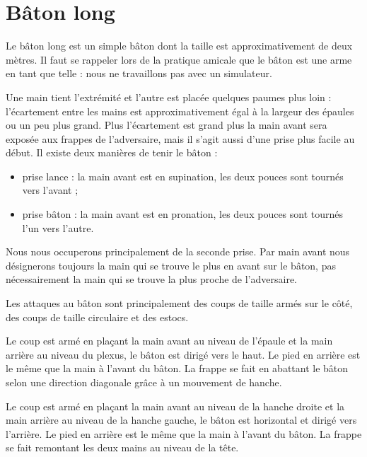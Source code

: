 \chapter{Bâton long}


Le bâton long est un simple bâton dont la taille est approximativement de deux mètres.
Il faut se rappeler lors de la pratique amicale que le bâton est une arme en tant que telle : nous ne travaillons pas avec un simulateur.

Une main tient l'extrémité et l'autre est placée quelques paumes plus loin : l'écartement entre les mains est approximativement égal à la largeur des épaules ou un peu plus grand.
Plus l'écartement est grand plus la main avant sera exposée aux frappes de l'adversaire, mais il s'agit aussi d'une prise plus facile au début.
Il existe deux manières de tenir le bâton :
\begin{itemize}
	\item prise lance : la main avant est en supination, les deux pouces sont tournés vers l'avant ;
	\item prise bâton : la main avant est en pronation, les deux pouces sont tournés l'un vers l'autre.
\end{itemize}
Nous nous occuperons principalement de la seconde prise.
Par main avant nous désignerons toujours la main qui se trouve le plus en avant sur le bâton, pas nécessairement la main qui se trouve la plus proche de l'adversaire.

Les attaques au bâton sont principalement des coups de taille armés sur le côté, des coups de taille circulaire et des estocs.


\begin{coup}

Le coup est armé en plaçant la main avant au niveau de l'épaule et la main arrière au niveau du plexus, le bâton est dirigé vers le haut.
Le pied en arrière est le même que la main à l'avant du bâton.
La frappe se fait en abattant le bâton selon une direction diagonale grâce à un mouvement de hanche.
\end{coup}


\begin{coup}

Le coup est armé en plaçant la main avant au niveau de la hanche droite et la main arrière au niveau de la hanche gauche, le bâton est horizontal et dirigé vers l'arrière.
Le pied en arrière est le même que la main à l'avant du bâton.
La frappe se fait remontant les deux mains au niveau de la tête.
\end{coup}


